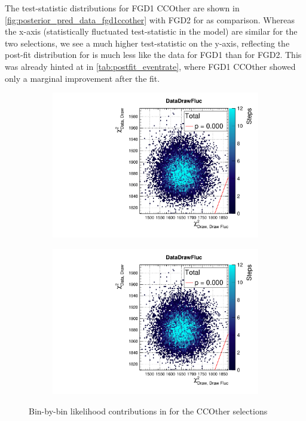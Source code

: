 The test-statistic distributions for FGD1 CCOther are shown in \autoref{fig:posterior_pred_data_fgd1ccother} with FGD2 for as comparison. Whereas the x-axis (statistically fluctuated test-statistic in the model) are similar for the two selections, we see a much higher test-statistic on the y-axis, reflecting the post-fit distribution for is much less like the data for FGD1 than for FGD2. This was already hinted at in \autoref{tab:postfit_eventrate}, where FGD1 CCOther showed only a marginal improvement after the fit.
\begin{figure}[h]
	\begin{subfigure}[t]{0.49\textwidth}
		\includegraphics[width=\textwidth, trim={0mm 6mm 0mm 11mm}, clip,page=16]{figures/mach3/data/postpred/2017b_NewData_NewDet_UpdXsecStep_2Xsec_4Det_5Flux_0_PostPred_procs}
	\end{subfigure}
\begin{subfigure}[t]{0.49\textwidth}
	\includegraphics[width=\textwidth, trim={0mm 6mm 0mm 11mm}, clip,page=52]{figures/mach3/data/postpred/2017b_NewData_NewDet_UpdXsecStep_2Xsec_4Det_5Flux_0_PostPred_procs}
\end{subfigure}
	\caption{Bin-by-bin likelihood contributions in \pmu \cosmu for the CCOther selections}
	\label{fig:posterior_pred_data_fgd1ccother}
\end{figure}

